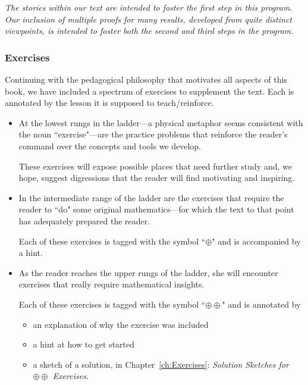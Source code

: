 \medskip

{\em The stories within our text are intended to foster the first step in this program.  Our inclusion of  multiple proofs for many results, developed from quite distinct viewpoints, is intended to foster both the second and third steps in the program. }

\subsubsection{Exercises}

Continuing with the pedagogical philosophy that motivates all aspects of this book, we have included a spectrum of exercises to supplement the text.  Each is annotated by the lesson it is supposed to teach/reinforce.
\begin{itemize}
\item
At the lowest rungs in the ladder---a physical metaphor seems consistent with the noun ``exercise"---are the practice problems that reinforce the reader's command over the concepts and tools we develop.

\smallskip

These exercises will expose possible places that need further study and, we hope, suggest digressions that the reader will find motivating and inspiring.

\medskip\item
In the intermediate range of the ladder are the exercises that require the reader to ``do" some original mathematics---for which the text to that point has adequately prepared the reader. 

\smallskip

Each of these exercises is tagged with the symbol ``$\oplus$" and is accompanied by a hint.

\medskip\item
As the reader reaches the upper rungs of the ladder, she will encounter exercises that really require mathematical insights.

\smallskip

Each of these exercises is tagged with the symbol ``$\oplus \oplus$" and is annotated by
  \begin{itemize}
  \item
an explanation of why the exercise was included
  \medskip\item
a hint at how to get started
  \medskip\item
a sketch of a solution, in Chapter~\ref{ch:Exercises}: {\em Solution Sketches for $\oplus \oplus$ Exercises}.
  \end{itemize} 


\end{itemize}
